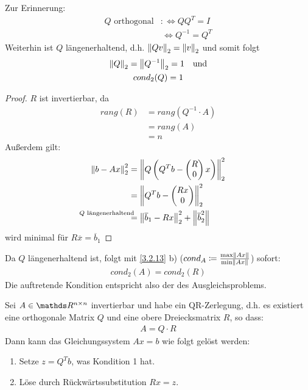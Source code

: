 Zur Erinnerung:
\begin{align*}
  Q \text{ orthogonal} &:\Leftrightarrow QQ^T = I \\
                       &\, \Leftrightarrow Q^{-1} = Q^T
\end{align*}
Weiterhin ist $Q$ längenerhaltend, d.h. $\nn[Qv]_2 = \nn[v]_2$ 
und somit folgt
\begin{gather}
  \nonumber
  \nn[Q]_2 = \nn[Q^{-1}]_2 = 1 \quad \text{und} \\
  cond_2(Q) = 1
  \label{IV.3.11}
\end{gather}

\begin{proof} $R$ ist invertierbar, da 
  \begin{align*}
    rang(R) &= rang(Q^{-1}\cdot A) \\	
            & = rang(A) \\
            &= n
  \end{align*}
  Außerdem gilt:
  \begin{align*}
    \nn[b-Ax]_2^2 & = \nn[Q\left(Q^Tb-\begin{pmatrix}R\\0\end{pmatrix}x\right)]_2^2 \\
                  &=  \nn[Q^Tb-\begin{pmatrix}Rx\\0\end{pmatrix}]_2^2  \\
                  &\overset{\mathllap{\text{$Q$ längenerhaltend}}}{=}
                    \nn[\overline{b}_1 - Rx]_2^2  + \nn[\overline{b}_2^2]
  \end{align*}
  wird minimal für $R\overline{x} = \overline{b}_1$
\end{proof}

Da $Q$ längenerhaltend ist, folgt mit \ref{3.2.13} b)
($cond_A \coloneqq \frac{\max \nn[Ax]}{\min \nn[Ax]}$)
sofort:
\begin{gather*}
  cond_2(A) = cond_2(R)
\end{gather*}
Die auftretende Kondition entspricht also der des Ausgleichsproblems.


\begin{Beme}
  Sei $A\in \Renn$ invertierbar und habe ein QR-Zerlegung, d.h. es existiert
  eine orthogonale Matrix $Q$ und eine obere Dreiecksmatrix $R$, so dass:
  \begin{gather*}
    A= Q\cdot R
  \end{gather*}
  Dann kann das Gleichungssystem $Ax=b$ wie folgt gelöst werden:
  \begin{enumerate}[1.]
  \item Setze $z=Q^Tb$, was Kondition 1 hat.
  \item Löse durch Rückwärtssubstitution $Rx=z$.
  \end{enumerate}
\end{Beme}


